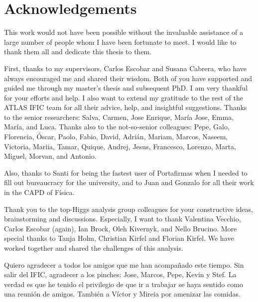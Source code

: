 
\chapter*{Acknowledgements}
 

This work would not have been possible without the invaluable assistance of a large number of people whom I have been fortunate to meet. I would like to thank them all and dedicate this thesis to them.

First, thanks to my supervisors, Carlos Escobar and Susana Cabrera, who have always encouraged me and shared their wisdom. Both of you have supported and guided me through my master's thesis and subsequent PhD. I am very thankful for your efforts and help.
I also want to extend my gratitude to the rest of the ATLAS IFIC team for all their advice, help, and insightful suggestions.
Thanks to the senior researchers: Salva, Carmen, Jose Enrique, María Jose, Emma, María, and Luca. Thanks also to the not-so-senior colleagues: Pepe, Galo, Florencia, Óscar, Paolo, Fabio, David, Adrián, Mariam, Marcos, Naseem, Victoria, Mariia, Tamar, Quique, Andrej, Jesus, Francesco, Lorenzo, Marta, Miguel, Morvan, and Antonio.

Also, thanks to Santi  for being the fastest user of Portafirmas when I needed to fill out bureaucracy for the university, and to Juan  and Gonzalo for all their work in the CAPD of Física.


Thank you to the top-Higgs analysis group colleagues for your constructive ideas, brainstorming and discussions. 
Especially, I want to thank Valentina Vecchio, Carlos Escobar (again), Ian Brock, Oleh Kivernyk, and Nello Brucino. 
More special thanks to  Tanja Holm, Christian Kirfel and Florian Kirfel. We have worked together and shared the challenges of this analysis.

Quiero agradecer a todos los amigos que me han acompañado este tiempo.  
Sin salir del IFIC, agradecer a los pinches: Jose, Marcos, Pepe, Kevin y Stef. 
La verdad es que he tenido el privilegio de que ir a trabajar se haya sentido como una reunión de amigos. También a Víctor y Mireia por amenizar las comidas.   

